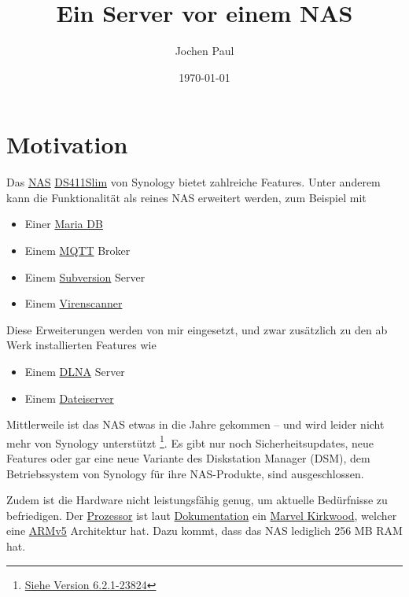 \documentclass[12pt,a4paper]{article}
\author{Jochen Paul}
\title{Ein Server vor einem NAS}
\date{\today}
\begin{document}
\clearpage\maketitle
\thispagestyle{empty}
\newpage

\thispagestyle{fancy}
\newpage
\clearpage
\tableofcontents
{}
\newpage

\section{Motivation}
Das \href{https://de.wikipedia.org/wiki/Network_Attached_Storage}{NAS}
\href{https://www.synology.com/en-global/company/news/article/Synology_Unveils_DiskStation_DS411slim}{DS411Slim} von
Synology bietet zahlreiche Features. Unter anderem kann die Funktionalität als reines NAS erweitert werden, zum Beispiel
mit

\begin{itemize}
    \item Einer \href{https://de.wikipedia.org/wiki/MariaDB}{Maria DB}
    \item Einem \href{https://de.wikipedia.org/wiki/MQTT}{MQTT} Broker
    \item Einem \href{https://de.wikipedia.org/wiki/Subversion}{Subversion} Server
    \item Einem \href{https://de.wikipedia.org/wiki/Antivirenprogramm}{Virenscanner}
\end{itemize}

Diese Erweiterungen werden von mir eingesetzt, und zwar zusätzlich zu den ab Werk installierten Features wie

\begin{itemize}
    \item Einem \href{https://de.wikipedia.org/wiki/Digital_Living_Network_Alliance}{DLNA} Server
    \item Einem \href{https://de.wikipedia.org/wiki/Dateiserver}{Dateiserver}
\end{itemize}

Mittlerweile ist das NAS etwas in die Jahre gekommen -- und wird leider nicht mehr von Synology unterstützt
\footnote{\href{https://www.synology.com/de-de/releaseNote/DS411slim}{Siehe Version 6.2.1-23824}}. Es gibt nur noch
Sicherheitsupdates, neue Features oder gar eine neue Variante des Diskstation Manager (DSM), dem Betriebssystem von
Synology für ihre NAS-Produkte, sind ausgeschlossen.

Zudem ist die Hardware nicht leistungsfähig genug, um aktuelle Bedürfnisse zu befriedigen. Der
\href{https://de.wikipedia.org/wiki/Prozessor}{Prozessor} ist laut
\href{https://global.download.synology.com/download/Document/DataSheet/DiskStation/11-year/DS411slim/Synology_DS411slim_Data_Sheet_enu.pdf}{Dokumentation}
ein \href{https://wikidevi.com/wiki/Marvell#Kirkwood}{Marvel Kirkwood}, welcher eine
\href{https://de.wikipedia.org/wiki/ARM-Architektur}{ARMv5} Architektur hat. Dazu kommt, dass das NAS lediglich 256 MB
RAM hat.
\end{document}
